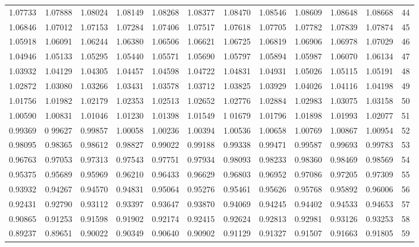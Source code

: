 \begin{center}
\begin{tabular}{|rrrrrrrrrrr|r|}
1.07733&1.07888&1.08024&1.08149&1.08268&1.08377&1.08470&1.08546&1.08609&1.08648&1.08668&44\\[5pt]
1.06846&1.07012&1.07153&1.07284&1.07406&1.07517&1.07618&1.07705&1.07782&1.07839&1.07874&45\\
1.05918&1.06091&1.06244&1.06380&1.06506&1.06621&1.06725&1.06819&1.06906&1.06978&1.07029&46\\
1.04946&1.05133&1.05295&1.05440&1.05571&1.05690&1.05797&1.05894&1.05987&1.06070&1.06134&47\\
1.03932&1.04129&1.04305&1.04457&1.04598&1.04722&1.04831&1.04931&1.05026&1.05115&1.05191&48\\
1.02872&1.03080&1.03266&1.03431&1.03578&1.03712&1.03825&1.03929&1.04026&1.04116&1.04198&49\\[5pt]
1.01756&1.01982&1.02179&1.02353&1.02513&1.02652&1.02776&1.02884&1.02983&1.03075&1.03158&50\\
1.00590&1.00831&1.01046&1.01230&1.01398&1.01549&1 01679&1.01796&1.01898&1.01993&1.02077&51\\
0.99369&0 99627&0.99857&1.00058&1.00236&1.00394&1.00536&1.00658&1.00769&1.00867&1.00954&52\\
0.98095&0.98365&0.98612&0.98827&0.99022&0.99188&0.99338&0.99471&0.99587&0.99693&0.99783&53\\
0.96763&0.97053&0.97313&0.97543&0.97751&0.97934&0.98093&0.98233&0.98360&0.98469&0.98569&54\\[5pt]
0.95375&0.95689&0.95969&0.96210&0.96433&0.96629&0.96803&0.96952&0.97086&0.97205&0.97309&55\\
0.93932&0.94267&0.94570&0.94831&0.95064&0.95276&0.95461&0.95626&0.95768&0.95892&0.96006&56\\
0.92431&0.92790&0.93112&0.93397&0.93647&0.93870&0.94069&0.94245&0.94402&0.94533&0.94653&57\\
0.90865&0.91253&0.91598&0.91902&0.92174&0.92415&0.92624&0.92813&0.92981&0.93126&0.93253&58\\
0.89237&0.89651&0.90022&0.90349&0.90640&0.90902&0.91129&0.91327&0.91507&0.91663&0.91805&59\\
\hline\end{tabular}
\end{center}
